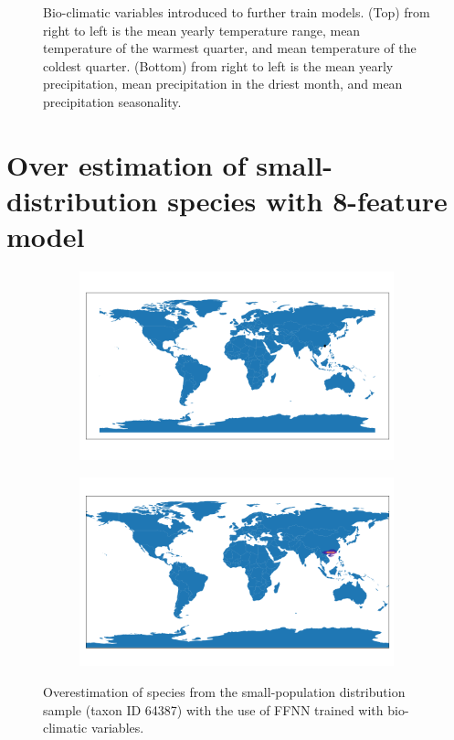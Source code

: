 \begin{figure}[H]
\begin{subfigure}{.3\linewidth}
\end{subfigure} 

\caption{Bio-climatic variables introduced to further train models. (Top) from right to left is the mean yearly temperature range, mean temperature of the warmest quarter, and mean temperature of the coldest quarter.
(Bottom) from right to left is the mean yearly precipitation, mean precipitation in the driest month, and mean precipitation seasonality.}
\label{fig:extra}
\end{figure}

\section{Over estimation of small-distribution species with 8-feature model}\label{appendix:smalldistn}

\begin{figure}[H]
\centering

\begin{subfigure}{.4\linewidth}
  \includegraphics[width=\linewidth]{Images/small_distn_true.png}

\end{subfigure}
\begin{subfigure}{.4\linewidth}
  \includegraphics[width=\linewidth]{Images/small_distn_overestimation.png}

\end{subfigure}
\caption{Overestimation of species from the small-population distribution sample (taxon ID 64387) with the use of FFNN trained with bio-climatic variables.}
\end{figure}

